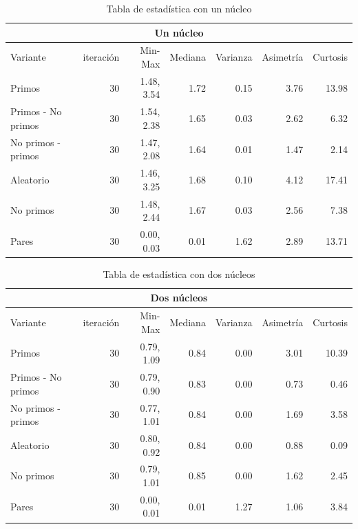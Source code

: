 \documentclass{article}
\begin{document}
\begin{table}[H]
\begin{center}
\begin{tabular}{|l | r | r | r | r | r | r|}
\hline
\multicolumn{7}{|c|}{Un núcleo}\\
\hline
Variante&iteración&Min-Max&Mediana&Varianza&Asimetría&Curtosis\\
\hline
 Primos               & 30 & 1.48, 3.54  & 1.72 & 0.15 & 3.76   & 13.98\\
 Primos - No primos   & 30 & 1.54, 2.38  & 1.65 & 0.03 & 2.62   & 6.32\\
 No primos - primos   & 30 & 1.47, 2.08  & 1.64 & 0.01  & 1.47  & 2.14\\
 Aleatorio            & 30 & 1.46, 3.25  & 1.68 & 0.10 & 4.12   & 17.41\\
 No primos            & 30 & 1.48, 2.44  & 1.67 & 0.03 & 2.56   & 7.38\\
 Pares                & 30 & 0.00, 0.03  & 0.01 & 1.62  & 2.89  & 13.71\\
\hline
\end{tabular}
\caption{Tabla de estadística con un núcleo }
\label{table:1}
\end{center}
\end{table}

\begin{table}[H]
\begin{center}
\begin{tabular}{|l | r | r | r | r | r | r|}
\hline
\multicolumn{7}{|c|}{Dos núcleos}\\
\hline
Variante&iteración&Min-Max&Mediana&Varianza&Asimetría&Curtosis\\
\hline
 Primos               & 30 & 0.79, 1.09  & 0.84 & 0.00 & 3.01   & 10.39\\
 Primos - No primos   & 30 & 0.79, 0.90  & 0.83 & 0.00 & 0.73   & 0.46\\
 No primos - primos   & 30 & 0.77, 1.01  & 0.84 & 0.00  & 1.69  & 3.58\\
 Aleatorio            & 30 & 0.80, 0.92  & 0.84 & 0.00 & 0.88   & 0.09\\
 No primos            & 30 & 0.79, 1.01  & 0.85 & 0.00 & 1.62   & 2.45\\
 Pares                & 30 & 0.00, 0.01  & 0.01 & 1.27  & 1.06  & 3.84\\
\hline
\end{tabular}
\caption{Tabla de estadística con dos núcleos}
\label{table:1}
\end{center}
\end{table}
\end{document}
